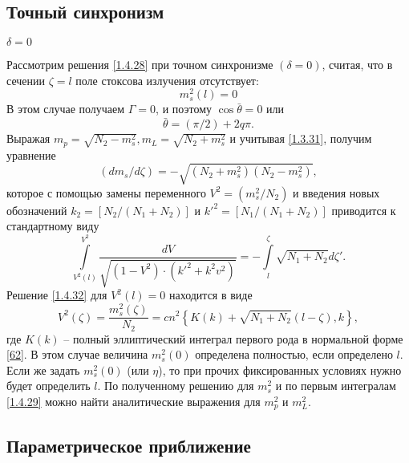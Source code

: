 \documentclass[a4paper]{article}
\begin{document}
\subsection{Точный синхронизм}
\begin{center}
	$\delta=0$	
\end{center}
Рассмотрим решения \eqref{1.4.28} при точном синхронизме $(\delta=0)$, считая, что в сечении $\zeta=l$  поле стоксова излучения отсутствует: 
\begin{equation}
	m_{s}^{2}(l)=0
	\label{1.4.30}
\end{equation}
В этом случае получаем $\Gamma=0$, и поэтому $\cos\bar{\theta}=0$   или 
\begin{equation}
	\bar{\theta}=(\pi/2)+2q\pi.
	\label{1.4.31}
\end{equation}
Выражая $m_{p}=\sqrt{N_{2}-m_{s}^{2}}, m_{L}=\sqrt{N_{2}+m_{s}^{2}}$ и учитывая \eqref{1.3.31}, получим уравнение
\begin{equation}
	(dm_{s}/d\zeta)=-\sqrt{(N_{2}+m_{s}^{2})(N_{2}-m_{s}^{2})},
	\tag{32'}\label{1.4.32'}
\end{equation}
которое с помощью замены переменного $V^{2}=(m_{s}^{2}/N_{2})$  и введения новых обозначений  $k_{2}=\left[N_{2}/(N_{1}+N_{2})\right]$  и $k'^{2}=\left[N_{1}/(N_{1}+N_{2})\right]$ приводится к стандартному виду 
\begin{equation}
	\int\limits_{V^{2}(l)}^{V^{2}}\frac{dV}{\sqrt{(1-V^{2})\cdot(k'^{2}+k^{2}v^{2})}}=-\int\limits_{l}^{\zeta}\sqrt{N_{1}+N_{2}}d\zeta'.
	\label{1.4.32}
\end{equation}
Решение \eqref{1.4.32} для $V^{2}(l)=0$  находится в виде 
\begin{equation}
	V^{2}(\zeta)=\frac{m_{s}^{2}(\zeta)}{N_{2}}=cn^{2}\left\{K(k)+\sqrt{N_{1}+N_{2}}(l-\zeta),k\right\},
	\label{1.4.33}
\end{equation}
где $K(k)$ -- полный эллиптический интеграл первого рода в нормальной форме \eqref{62}. В этом случае величина $m_{s}^{2}(0)$ определена полностью, если определено $l$. Если же задать $m_{s}^{2}(0)$  (или $\eta$), то при прочих фиксированных условиях нужно будет определить $l$. По полученному решению для $m_{s}^{2}$  и по первым интегралам \eqref{1.4.29} можно найти аналитические выражения  для $m_{p}^{2}$  и $m_{L}^{2}$. 

\subsection{Параметрическое приближение}
\end{document}
